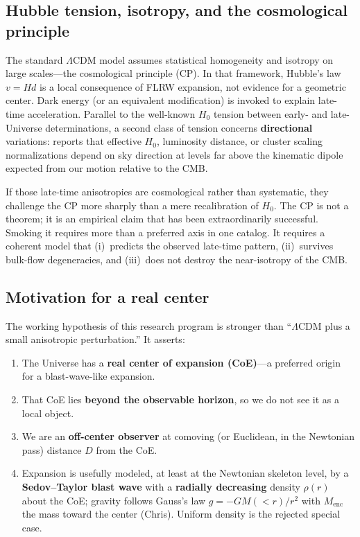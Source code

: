 \documentclass[11pt,a4paper]{article}
\begin{document}
\subsection{Hubble tension, isotropy, and the cosmological principle}

The standard \(\Lambda\)CDM model assumes statistical homogeneity and isotropy on large scales---the cosmological principle (CP). In that framework, Hubble's law \(v=Hd\) is a local consequence of FLRW expansion, not evidence for a geometric center. Dark energy (or an equivalent modification) is invoked to explain late-time acceleration. Parallel to the well-known \(H_0\) tension between early- and late-Universe determinations, a second class of tension concerns \textbf{directional} variations: reports that effective \(H_0\), luminosity distance, or cluster scaling normalizations depend on sky direction at levels far above the kinematic dipole expected from our motion relative to the CMB.

If those late-time anisotropies are cosmological rather than systematic, they challenge the CP more sharply than a mere recalibration of \(H_0\). The CP is not a theorem; it is an empirical claim that has been extraordinarily successful. Smoking it requires more than a preferred axis in one catalog. It requires a coherent model that (i)~predicts the observed late-time pattern, (ii)~survives bulk-flow degeneracies, and (iii)~does not destroy the near-isotropy of the CMB.

\subsection{Motivation for a real center}

The working hypothesis of this research program is stronger than ``\(\Lambda\)CDM plus a small anisotropic perturbation.'' It asserts:
\begin{enumerate}
\item The Universe has a \textbf{real center of expansion (CoE)}---a preferred origin for a blast-wave-like expansion.
\item That CoE lies \textbf{beyond the observable horizon}, so we do not see it as a local object.
\item We are an \textbf{off-center observer} at comoving (or Euclidean, in the Newtonian pass) distance \(D\) from the CoE.
\item Expansion is usefully modeled, at least at the Newtonian skeleton level, by a \textbf{Sedov--Taylor blast wave} with a \textbf{radially decreasing} density \(\rho(r)\) about the CoE; gravity follows Gauss's law \(g=-G M(<r)/r^2\) with \(M_{\mathrm{enc}}\) the mass toward the center (Chris). Uniform density is the rejected special case.
\end{enumerate}
\end{document}
